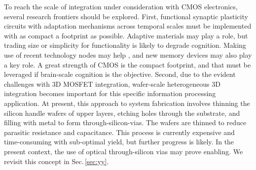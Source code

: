 \documentclass[twocolumn]{article}
\begin{document}
To reach the scale of integration under consideration with CMOS electronics, several research frontiers should be explored. First, functional synaptic plasticity circuits with adaptation mechanisms across temporal scales must be implemented with as compact a footprint as possible. Adaptive materials may play a role, but trading size or simplicity for functionality is likely to degrade cognition. Making use of recent technology nodes may help \cite{rupa2019}, and new memory devices may also play a key role. A great strength of CMOS is the compact footprint, and that must be leveraged if brain-scale cognition is the objective. Second, due to the evident challenges with 3D MOSFET integration, wafer-scale heterogeneous 3D integration becomes important for this specific information processing application. At present, this approach to system fabrication involves thinning the silicon handle wafers of upper layers, etching holes through the substrate, and filling with metal to form through-silicon-vias. The wafers are thinned to reduce parasitic resistance and capacitance. This process is currently expensive and time-consuming with sub-optimal yield, but further progress is likely. In the present context, the use of optical through-silicon vias may prove enabling. We revisit this concept in Sec.\,\ref{sec:yy}. 
\end{document}
